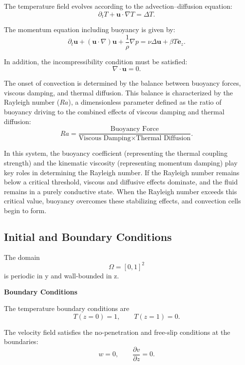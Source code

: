 The temperature field evolves according to the advection--diffusion equation:
\begin{equation}
\partial_t T + \mathbf{u} \cdot \nabla T = \Delta T .
\end{equation}

The momentum equation including buoyancy is given by:
\begin{equation}
\partial_t \mathbf{u} + (\mathbf{u} \cdot \nabla)\mathbf{u} + \frac{1}{\rho}\nabla p
= \nu \Delta \mathbf{u} + \beta T \mathbf{e}_z .
\end{equation}

In addition, the incompressibility condition must be satisfied:
\begin{equation}
\nabla \cdot \mathbf{u} = 0 .
\end{equation}

The onset of convection is determined by the balance between buoyancy forces, viscous damping, and thermal diffusion. This balance is characterized by the Rayleigh number ($Ra$), a dimensionless parameter defined as the ratio of buoyancy driving to the combined effects of viscous damping and thermal diffusion:
\begin{equation}
Ra = \frac{\text{Buoyancy Force}}{\text{Viscous Damping} \times \text{Thermal Diffusion}} .
\end{equation}

In this system, the buoyancy coefficient (representing the thermal coupling strength) and the kinematic viscosity (representing momentum damping) play key roles in determining the Rayleigh number. If the Rayleigh number remains below a critical threshold, viscous and diffusive effects dominate, and the fluid remains in a purely conductive state. When the Rayleigh number exceeds this critical value, buoyancy overcomes these stabilizing effects, and convection cells begin to form.

\subsection{Initial and Boundary Conditions}
The domain \[\Omega = [0,1]^2\] is periodic in y and wall-bounded in z.


\textbf{Boundary Conditions}

The temperature boundary conditions are
\begin{equation}
T(z=0) = 1, \qquad T(z=1) = 0 .
\end{equation}

The velocity field satisfies the no-penetration and free-slip conditions at the boundaries:
\begin{equation}
w = 0, \qquad \frac{\partial v}{\partial z} = 0 .
\end{equation}

